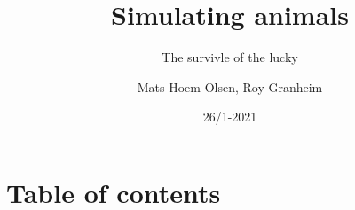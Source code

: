 \documentclass[12pt]{beamer}
\begin{document}
\author{Mats Hoem Olsen, Roy Granheim}
\title{Simulating animals}
\subtitle{The survivle of the lucky}
\date{26/1-2021}
\subject{INF200}

\begin{frame}
\maketitle
\end{frame}

\section{Table of contents}
\begin{frame}
\tableofcontents
\end{frame}

\setcounter{section}{0}




\end{document}
